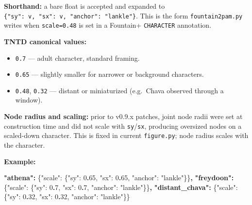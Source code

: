 \documentclass[
  12pt,
  letterpaper,
]{book}
\newenvironment{Shaded}{}{}
\newcommand{\DataTypeTok}[1]{\textcolor[rgb]{0.56,0.13,0.00}{#1}}
\newcommand{\DecValTok}[1]{\textcolor[rgb]{0.25,0.63,0.44}{#1}}
\newcommand{\ErrorTok}[1]{\textcolor[rgb]{1.00,0.00,0.00}{\textbf{#1}}}
\newcommand{\FunctionTok}[1]{\textcolor[rgb]{0.02,0.16,0.49}{#1}}
\newcommand{\StringTok}[1]{\textcolor[rgb]{0.25,0.44,0.63}{#1}}
\providecommand{\tightlist}{%
  \setlength{\itemsep}{0pt}\setlength{\parskip}{0pt}}
\begin{document}
\textbf{Shorthand:} a bare float is accepted and expanded to
\texttt{\{"sy":\ v,\ "sx":\ v,\ "anchor":\ "lankle"\}}. This is the form
\texttt{fountain2pam.py} writes when \texttt{scale=0.48} is set in a
Fountain+ \texttt{CHARACTER} annotation.

\textbf{TNTD canonical values:}

\begin{itemize}
\tightlist
\item
  \texttt{0.7} --- adult character, standard framing.
\item
  \texttt{0.65} --- slightly smaller for narrower or background
  characters.
\item
  \texttt{0.48}, \texttt{0.32} --- distant or miniaturized (e.g.~Chava
  observed through a window).
\end{itemize}

\textbf{Node radius and scaling:} prior to v0.9.x patches, joint node
radii were set at construction time and did not scale with
\texttt{sy}/\texttt{sx}, producing oversized nodes on a scaled-down
character. This is fixed in current \texttt{figure.py}; node radius
scales with the character.

\textbf{Example:}

\begin{Shaded}
\begin{Highlighting}[]
\ErrorTok{"athena":}  \FunctionTok{\{}\DataTypeTok{"scale"}\FunctionTok{:} \FunctionTok{\{}\DataTypeTok{"sy"}\FunctionTok{:} \DecValTok{0}\ErrorTok{.}\DecValTok{65}\FunctionTok{,} \DataTypeTok{"sx"}\FunctionTok{:} \DecValTok{0}\ErrorTok{.}\DecValTok{65}\FunctionTok{,} \DataTypeTok{"anchor"}\FunctionTok{:} \StringTok{"lankle"}\FunctionTok{\}\}}\ErrorTok{,}
\ErrorTok{"freydoon":} \FunctionTok{\{}\DataTypeTok{"scale"}\FunctionTok{:} \FunctionTok{\{}\DataTypeTok{"sy"}\FunctionTok{:} \DecValTok{0}\ErrorTok{.}\DecValTok{7}\FunctionTok{,}  \DataTypeTok{"sx"}\FunctionTok{:} \DecValTok{0}\ErrorTok{.}\DecValTok{7}\FunctionTok{,}  \DataTypeTok{"anchor"}\FunctionTok{:} \StringTok{"lankle"}\FunctionTok{\}\}}\ErrorTok{,}
\ErrorTok{"distant\_chava":} \FunctionTok{\{}\DataTypeTok{"scale"}\FunctionTok{:} \FunctionTok{\{}\DataTypeTok{"sy"}\FunctionTok{:} \DecValTok{0}\ErrorTok{.}\DecValTok{32}\FunctionTok{,} \DataTypeTok{"sx"}\FunctionTok{:} \DecValTok{0}\ErrorTok{.}\DecValTok{32}\FunctionTok{,} \DataTypeTok{"anchor"}\FunctionTok{:} \StringTok{"lankle"}\FunctionTok{\}\}}
\end{Highlighting}
\end{Shaded}
\end{document}
